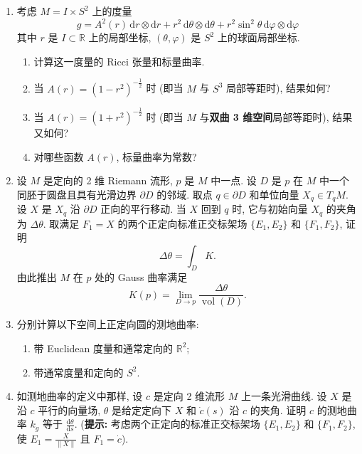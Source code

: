 \begin{RiemannExercise}
\begin{enumerate}[label=(\arabic*),ref=\arabic*,leftmargin=*]
\[\]
给出的参数化 $\varphi:(0,+\infty)\times\mathbb{R}\to\mathbb{R}^3$ 的像, $N$ 是由
\[
  \psi(u,v)=(u\cos v,u\sin v,\log u).
\]
给出的参数化 $\psi:(0,+\infty)\times\mathbb{R}\to\mathbb{R}^3$ 的像. 在 $M$ 和 $N$ 上都取由 $\mathbb{R}^3$ 的 Euclidean 度量诱导的 Riemann 度量. 证明由
\[
  f(\varphi(u,v))=\psi(u,v)
\]
定义的映射 $f:M\to N$ 保持 Gauss 曲率, 但不是局部等距映射.
\item\label{ex:ricci-and-scalar-curvature-of-radial-metric} 考虑 $M=I\times S^2$ 上的度量
\[
  g=A^2(r)\,\mathrm{d}r\otimes\mathrm{d}r+r^2\,\mathrm{d}\theta\otimes\mathrm{d}\theta
  +r^2\sin^2\theta\,\mathrm{d}\varphi\otimes\mathrm{d}\varphi
\]
其中 $r$ 是 $I\subset\mathbb{R}$ 上的局部坐标, $(\theta,\varphi)$ 是 $S^2$ 上的球面局部坐标.
\begin{enumerate}[label=(\alph*),leftmargin=*]
\item 计算这一度量的 Ricci 张量和标量曲率.
\item 当 $A(r)=(1-r^2)^{-\frac12}$ 时 (即当 $M$ 与 $S^3$ 局部等距时), 结果如何?
\item 当 $A(r)=(1+r^2)^{-\frac12}$ 时 (即当 $M$ 与\textbf{双曲 3 维空间}局部等距时), 结果又如何?
\item 对哪些函数 $A(r)$, 标量曲率为常数?
\end{enumerate}
\item\label{ex:gauss-curvature-by-holonomy} 设 $M$ 是定向的 2 维 Riemann 流形, $p$ 是 $M$ 中一点. 设 $D$ 是 $p$ 在 $M$ 中一个同胚于圆盘且具有光滑边界 $\partial D$ 的邻域. 取点 $q\in\partial D$ 和单位向量 $X_q\in T_qM$. 设 $X$ 是 $X_q$ 沿 $\partial D$ 正向的平行移动. 当 $X$ 回到 $q$ 时, 它与初始向量 $X_q$ 的夹角为 $\Delta\theta$. 取满足 $F_1=X$ 的两个正定向标准正交标架场 $\{E_1,E_2\}$ 和 $\{F_1,F_2\}$, 证明
\[
  \Delta\theta=\int_D K.
\]
由此推出 $M$ 在 $p$ 处的 Gauss 曲率满足
\[
  K(p)=\lim_{D\to p}\frac{\Delta\theta}{\operatorname{vol}(D)}.
\]
\item\label{ex:geodesic-curvature-of-circles} 分别计算以下空间上正定向圆的测地曲率:
\begin{enumerate}[label=(\alph*),leftmargin=*]
\item 带 Euclidean 度量和通常定向的 $\mathbb{R}^2$;
\item 带通常度量和定向的 $S^2$.
\end{enumerate}
\item\label{ex:geodesic-curvature-as-angle-derivative} 如测地曲率的定义中那样, 设 $c$ 是定向 2 维流形 $M$ 上一条光滑曲线. 设 $X$ 是沿 $c$ 平行的向量场, $\theta$ 是给定定向下 $X$ 和 $\dot c(s)$ 沿 $c$ 的夹角. 证明 $c$ 的测地曲率 $k_g$ 等于 $\frac{\mathrm{d}\theta}{\mathrm{d}s}$.
{\small (\textbf{提示:} 考虑两个正定向的标准正交标架场 $\{E_1,E_2\}$ 和 $\{F_1,F_2\}$, 使 $E_1=\frac{X}{\lVert X\rVert}$ 且 $F_1=\dot c$).}
\end{enumerate}
\end{RiemannExercise}
